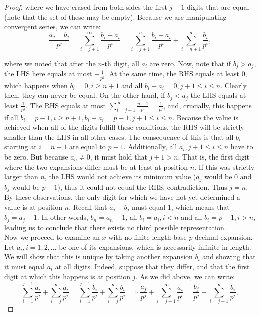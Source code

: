 \begin{proof}
    where we have erased from both sides the first $j-1$ digits that are equal (note that the set of these may be empty). Because we are manipulating convergent series, we can write:
    $$\frac{a_j - b_j}{p^j} = \sum_{i=j+1}^{\infty}\frac{b_i - a_i}{p^i} = \sum_{i=j+1}^{n} \frac{b_i-a_i}{p^i} + \sum_{i=n+1}^{\infty}\frac{b_i}{p^i},$$

    where we noted that after the $n$-th digit, all $a_i$ are zero. Now, note that if $b_j > a_j$, the LHS here equals at most $-\frac{1}{p^j}$. At the same time, the RHS equals at least 0, which happens when $b_i = 0, i \geq n+1$ and all $b_i - a_i = 0, j+1 \leq i \leq n$. Clearly then, they can never be equal. On the other hand, if $b_j < a_j$ the LHS equals at least $\frac{1}{p^j}$. The RHS equals at most $\sum_{i=j+1}^{\infty} \frac{p-1}{p^i} = \frac{1}{p^j}$, and, crucially, this happens if all $b_i = p -1, i \geq n+1, b_i - a_i = p -1, j + 1 \leq i \leq n$. Because the value is achieved when all of the digits fulfill these conditions, the RHS will be strictly smaller than the LHS in all other cases. The consequence of this is that all $b_i$ starting at $i=n+1$ are equal to $p-1$. Additionally, all $a_i, j + 1\leq i \leq n$ have to be zero. But because $a_n \neq 0$, it must hold that $j + 1 > n$. That is, the first digit where the two expansions differ must be at least at position $n$. If this was strictly larger than $n$, the LHS would not achieve its minimum value ($a_j$ would be 0 and $b_j$ would be $p-1$), thus it could not equal the RHS, contradiction. Thus $j = n$. By these observations, the only digit for which we have not yet determined a value is at position $n$. Recall that $a_j - b_j$ must equal 1, which means that $b_j = a_j - 1$. In other words, $b_n = a_n - 1$, all $b_i = a_i, i < n$ and all $b_i = p - 1, i > n$, leading us to conclude that there exists no third possible representation.\\

    Now we proceed to examine an $x$ with no finite-length base $p$ decimal expansion. Let $a_i, i =1, 2, \ldots$ be one of its expansions, which is necessarily infinite in length. We will show that this is unique by taking another expansion $b_i$ and showing that it must equal $a_i$ at all digits. Indeed, suppose that they differ, and that the first digit at which this happens is at position $j$. As we did above, we can write:
    $$\sum_{i=1}^{j-1}\frac{a_i}{p^i} + \sum_{i=j}^{\infty}\frac{a_i}{p^i} = \sum_{i=1}^{j-1}\frac{b_i}{p^i} + \sum_{i=j}^{\infty}\frac{b_i}{p^i} \implies \frac{a_j}{p^j} + \sum_{i=j+1}^{\infty} \frac{a_i}{p^i} = \frac{b_j}{p^j} + \sum_{i=j+1}^{\infty}\frac{b_i}{p^i},$$


\end{proof}
